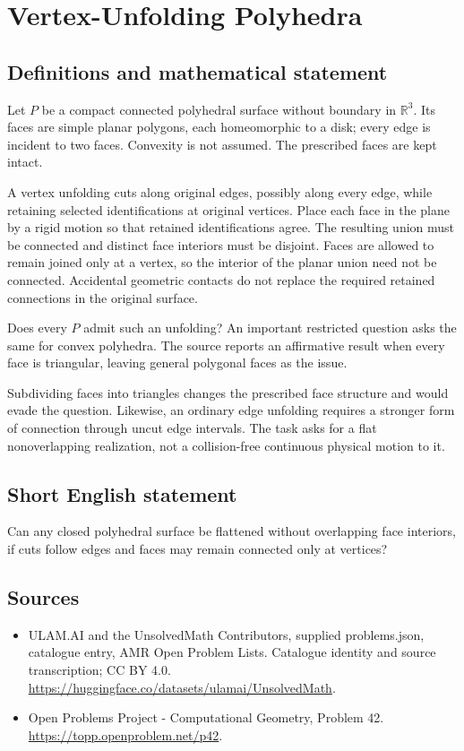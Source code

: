 \documentclass[11pt,a4paper]{article}
\begin{document}
\section*{Vertex-Unfolding Polyhedra}\label{statement}

\subsection{Definitions and mathematical statement}
Let $P$ be a compact connected polyhedral surface without boundary in
$\mathbb R^3$. Its faces are simple planar polygons, each homeomorphic
to a disk; every edge is incident to two faces. Convexity is not
assumed. The prescribed faces are kept intact.

A vertex unfolding cuts along original edges, possibly along every
edge, while retaining selected identifications at original vertices.
Place each face in the plane by a rigid motion so that retained
identifications agree. The resulting union must be connected and
distinct face interiors must be disjoint. Faces are allowed to
remain joined only at a vertex, so the interior of the planar union
need not be connected. Accidental geometric contacts do not replace
the required retained connections in the original surface.

Does every $P$ admit such an unfolding? An important restricted
question asks the same for convex polyhedra. The source reports an
affirmative result when every face is triangular, leaving general
polygonal faces as the issue.

Subdividing faces into triangles changes the prescribed face
structure and would evade the question. Likewise, an ordinary
edge unfolding requires a stronger form of connection through
uncut edge intervals. The task asks for a flat nonoverlapping
realization, not a collision-free continuous physical motion to it.
\subsection{Short English statement}
Can any closed polyhedral surface be flattened without overlapping
face interiors, if cuts follow edges and faces may remain connected
only at vertices?
\subsection{Sources}
\begin{itemize}
\item[S1] ULAM.AI and the UnsolvedMath Contributors, supplied problems.json, catalogue entry, AMR Open Problem Lists. Catalogue identity and source transcription; CC BY 4.0.
\url{https://huggingface.co/datasets/ulamai/UnsolvedMath}.
\item[S2] Open Problems Project - Computational Geometry, Problem 42. 
\url{https://topp.openproblem.net/p42}.
\end{itemize}
\end{document}
